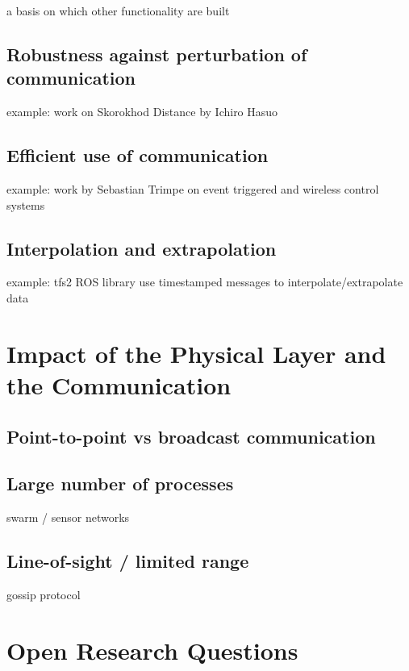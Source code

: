 \documentclass[
graybox,
envcountchap,
natbib
]{svmult}
\begin{document}
\begin{bibunit}
         a basis on which other functionality are built

         \subsection{Robustness against perturbation of communication}

         example: work on Skorokhod Distance by Ichiro Hasuo

         \subsection{Efficient use of communication}

         example: work by Sebastian Trimpe on event triggered and wireless control systems

         \subsection{Interpolation and extrapolation}

         example: tfs2 ROS library use timestamped messages to interpolate/extrapolate data

         \section{Impact of the Physical Layer and the Communication} %

         \subsection{Point-to-point vs broadcast communication}

         \subsection{Large number of processes}

         swarm / sensor networks

         \subsection{Line-of-sight / limited range}

         gossip protocol

         \section{Open Research Questions} %


\end{bibunit}
\end{document}
